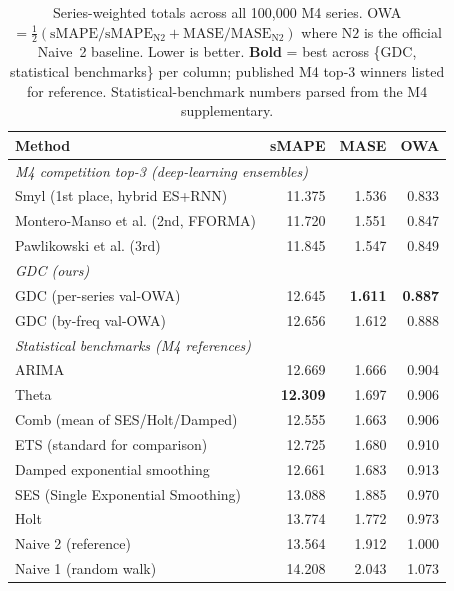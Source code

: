 %
\begin{table}[t]
\centering
\caption{Series-weighted totals across all 100{,}000 M4 series. OWA $= \tfrac{1}{2}(\text{sMAPE}/\text{sMAPE}_{\text{N2}} + \text{MASE}/\text{MASE}_{\text{N2}})$ where $\text{N2}$ is the official Naive~2 baseline. Lower is better. \textbf{Bold} = best across \{GDC, statistical benchmarks\} per column; published M4 top-3 winners listed for reference. Statistical-benchmark numbers parsed from the M4 supplementary.}
\label{tab:m4_overall}
\begin{tabular}{l r r r}
\toprule
Method & sMAPE & MASE & OWA \\
\midrule
\multicolumn{4}{l}{\emph{M4 competition top-3 (deep-learning ensembles)}} \\
Smyl (1st place, hybrid ES+RNN)        & 11.375 & 1.536 & 0.833 \\
Montero-Manso et al. (2nd, FFORMA)     & 11.720 & 1.551 & 0.847 \\
Pawlikowski et al. (3rd)               & 11.845 & 1.547 & 0.849 \\
\midrule
\multicolumn{4}{l}{\emph{GDC (ours)}} \\
GDC (per-series val-OWA)               & 12.645          & \textbf{1.611} & \textbf{0.887} \\
GDC (by-freq val-OWA)                  & 12.656          & 1.612          & 0.888 \\
\midrule
\multicolumn{4}{l}{\emph{Statistical benchmarks (M4 references)}} \\
ARIMA                                  & 12.669 & 1.666 & 0.904 \\
Theta                                  & \textbf{12.309} & 1.697 & 0.906 \\
Comb (mean of SES/Holt/Damped)         & 12.555 & 1.663 & 0.906 \\
ETS (standard for comparison)          & 12.725 & 1.680 & 0.910 \\
Damped exponential smoothing           & 12.661 & 1.683 & 0.913 \\
SES (Single Exponential Smoothing)     & 13.088 & 1.885 & 0.970 \\
Holt                                   & 13.774 & 1.772 & 0.973 \\
Naive 2 (reference)                    & 13.564 & 1.912 & 1.000 \\
Naive 1 (random walk)                  & 14.208 & 2.043 & 1.073 \\
\bottomrule
\end{tabular}
\end{table}
